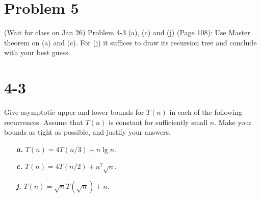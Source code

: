 \documentclass{../../class}
\begin{document}
\newpage
\section*{Problem 5}
\begin{tcolorbox}
    (Wait for class on Jan 26) Problem 4-3 (a), (c) and (j) (Page 108): Use Master theorem on (a) and (c). For (j) it suffices to draw its recursion tree and conclude with your best guess.
\end{tcolorbox}

\section*{4-3}
Give asymptotic upper and lower bounds for $T(n)$ in each of the following recurrences. Assume that $T(n)$ is constant for sufficiently small $n$. Make your bounds as tight as possible, and justify your answers.

\begin{itemize}
    \item[\textbf{\textit{a.}}] $T(n) = 4T(n/3) + n \lg{n}$.
    \item[\textbf{\textit{c.}}] $T(n) = 4T(n/2) + n^2 \sqrt{n}$.
    \item[\textbf{\textit{j.}}] $T(n) = \sqrt{n}T(\sqrt{n}) + n$.
\end{itemize}
\end{document}

